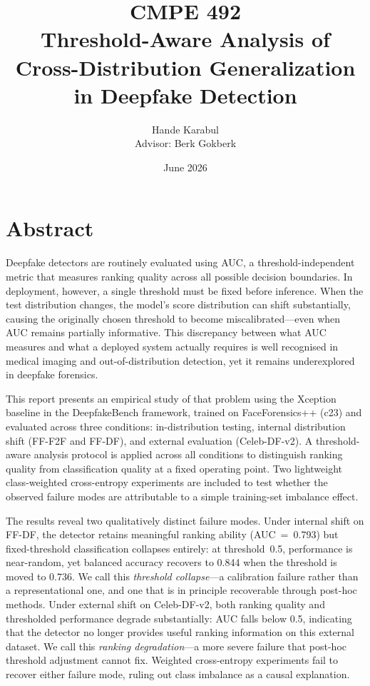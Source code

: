 \documentclass[a4paper,12pt]{report}
\begin{document}
\title{
  CMPE 492 \\[0.5em]
  \textbf{Threshold-Aware Analysis of Cross-Distribution Generalization in Deepfake Detection}
}
\author{
  Hande Karabul \\[0.5em]
  Advisor: Berk Gokberk
}
\date{June 2026}
\maketitle

\tableofcontents

\chapter*{Abstract}

Deepfake detectors are routinely evaluated using AUC, a
threshold-independent metric that measures ranking quality
across all possible decision boundaries.
In deployment, however, a single threshold must be fixed
before inference.
When the test distribution changes, the model's score
distribution can shift substantially, causing the originally
chosen threshold to become miscalibrated---even when AUC
remains partially informative.
This discrepancy between what AUC measures and what a
deployed system actually requires is well recognised in
medical imaging and out-of-distribution detection, yet it
remains underexplored in deepfake forensics.

This report presents an empirical study of that problem
using the Xception baseline in the DeepfakeBench framework,
trained on FaceForensics++ (c23) and evaluated across three
conditions: in-distribution testing, internal distribution
shift (FF-F2F and FF-DF), and external evaluation
(Celeb-DF-v2).
A threshold-aware analysis protocol is applied across all
conditions to distinguish ranking quality from classification
quality at a fixed operating point.
Two lightweight class-weighted cross-entropy experiments
are included to test whether the observed failure modes are
attributable to a simple training-set imbalance effect.

The results reveal two qualitatively distinct failure modes.
Under internal shift on FF-DF, the detector retains
meaningful ranking ability (AUC~=~0.793) but fixed-threshold
classification collapses entirely: at threshold~0.5,
performance is near-random, yet balanced accuracy recovers
to 0.844 when the threshold is moved to 0.736.
We call this \emph{threshold collapse}---a calibration
failure rather than a representational one, and one that
is in principle recoverable through post-hoc methods.
Under external shift on Celeb-DF-v2, both ranking quality
and thresholded performance degrade substantially: AUC falls
below 0.5, indicating that the detector no longer provides
useful ranking information on this external dataset.
We call this \emph{ranking degradation}---a more severe
failure that post-hoc threshold adjustment cannot fix.
Weighted cross-entropy experiments fail to recover either
failure mode, ruling out class imbalance as a causal
explanation.
\end{document}
